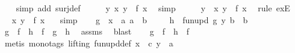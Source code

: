 \begin{isabellebody}
\ {}\ \isamarkupfalse%
\ {\isacharparenleft}simp\ add{\isacharcolon}\ surj{\isacharunderscore}def{\isacharparenright}\isanewline
\ \ \isamarkupfalse%
\ \isamarkupfalse%
\ {\isachardoublequoteopen}{\isasymexists}y{\isachardot}\ {\isasymnexists}x{\isachardot}\ y\ {\isacharequal}\ f\ x{\isachardoublequoteclose}\ \isamarkupfalse%
\ simp\isanewline
\ \ \isamarkupfalse%
\ \isamarkupfalse%
\ y{}\ \ {\isachardoublequoteopen}{\isasymnexists}x{\isachardot}\ y{}\ {\isacharequal}\ f\ x{\isachardoublequoteclose}\ \isamarkupfalse%
\ {\isacharparenleft}rule\ exE{\isacharparenright}\isanewline
\ \ \isamarkupfalse%
\ \isamarkupfalse%
\ {\isachardoublequoteopen}{\isasymforall}x{\isachardot}\ y{}\ {\isasymnoteq}\ f\ x{\isachardoublequoteclose}\ \ \isamarkupfalse%
\ simp\isanewline
\ \ \isamarkupfalse%
\ {\isacharquery}g\ {\isacharequal}\ {\isachardoublequoteopen}{\isasymlambda}x\ {\isacharcolon}{\isacharcolon}\ {\isacharprime}a{\isachardot}\ a\ {\isacharcolon}{\isacharcolon}\ {\isacharprime}b{\isachardoublequoteclose}\ \isanewline
\ \ \isamarkupfalse%
\ {\isacharquery}h\ {\isacharequal}{\isachardoublequoteopen}\ fun{\isacharunderscore}upd\ {\isacharquery}g\ y{}\ {\isacharparenleft}b\ {\isacharcolon}{\isacharcolon}\ {\isacharprime}b{\isacharparenright}{\isachardoublequoteclose}\isanewline
\ \ \isamarkupfalse%
\ {}{\isacharcolon}{\isachardoublequoteopen}{\isacharquery}g\ {\isasymcirc}\ f\ {\isacharequal}\ {\isacharquery}h\ {\isasymcirc}\ f\ {\isasymlongrightarrow}\ {\isacharquery}g\ {\isacharequal}\ {\isacharquery}h{\isachardoublequoteclose}\ \isamarkupfalse%
\ assms\ \isamarkupfalse%
\ blast\isanewline
\ \ \isamarkupfalse%
\ {}{\isacharcolon}{\isachardoublequoteopen}{\isacharquery}g\ {\isasymcirc}\ f\ {\isacharequal}\ {\isacharquery}h\ {\isasymcirc}\ f{\isachardoublequoteclose}\ \isanewline
\ \ \ \ \isamarkupfalse%
\ {\isacharparenleft}metis\ {\isacharparenleft}mono{\isacharunderscore}tags{\isacharcomma}\ lifting{\isacharparenright}\ fun{\isacharunderscore}upd{\isacharunderscore}def\ {\isacartoucheopen}{\isasymnexists}x\ {\isacharcolon}{\isacharcolon}\ {\isacharprime}c{\isachardot}\ {\isacharparenleft}y{}\ {\isacharcolon}{\isacharcolon}\ {\isacharprime}a{\isacharparenright}\ {\isacharequal}\isanewline

\end{isabellebody}
